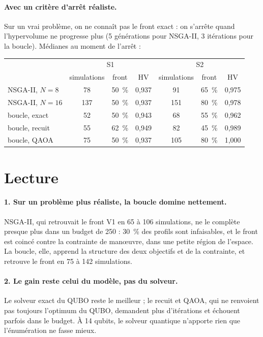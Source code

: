 \paragraph{Avec un critère d'arrêt réaliste.} Sur un vrai problème, on ne connaît pas le front exact : on s'arrête quand l'hypervolume ne progresse plus (5 générations pour NSGA-II, 3 itérations pour la boucle). Médianes au moment de l'arrêt :
\begin{center}
\begin{tabular}{lcccccc}
\toprule
 & \multicolumn{3}{c}{S1} & \multicolumn{3}{c}{S2} \\
 & simulations & front & HV & simulations & front & HV \\
\midrule
NSGA-II, $N=8$ & 78 & 50~\% & 0,937 & 91 & 65~\% & 0,975 \\
NSGA-II, $N=16$ & 137 & 50~\% & 0,937 & 151 & 80~\% & 0,978 \\
boucle, exact & 52 & 50~\% & 0,943 & 68 & 55~\% & 0,962 \\
boucle, recuit & 55 & 62~\% & 0,949 & 82 & 45~\% & 0,989 \\
boucle, QAOA & 75 & 50~\% & 0,937 & 105 & 80~\% & 1,000 \\
\bottomrule
\end{tabular}
\end{center}

\section{Lecture}
\paragraph{1. Sur un problème plus réaliste, la boucle domine nettement.} NSGA-II, qui retrouvait le front V1 en 65 à 106 simulations, ne le complète presque plus dans un budget de 250 : 30~\% des profils sont infaisables, et le front est coincé contre la contrainte de manœuvre, dans une petite région de l'espace. La boucle, elle, apprend la structure des deux objectifs et de la contrainte, et retrouve le front en 75 à 142 simulations.

\paragraph{2. Le gain reste celui du modèle, pas du solveur.} Le solveur exact du QUBO reste le meilleur ; le recuit et QAOA, qui ne renvoient pas toujours l'optimum du QUBO, demandent plus d'itérations et échouent parfois dans le budget. À 14 qubits, le solveur quantique n'apporte rien que l'énumération ne fasse mieux.

